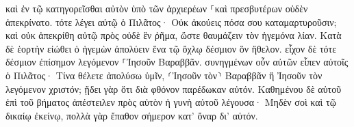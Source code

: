 \documentclass{openreader}
\begin{document}
καὶ ἐν τῷ κατηγορεῖσθαι αὐτὸν ὑπὸ τῶν ἀρχιερέων ⸀καὶ πρεσβυτέρων οὐδὲν ἀπεκρίνατο. 
τότε λέγει αὐτῷ ὁ Πιλᾶτος· Οὐκ ἀκούεις πόσα σου καταμαρτυροῦσιν; 
καὶ οὐκ ἀπεκρίθη αὐτῷ πρὸς οὐδὲ ἓν ῥῆμα, ὥστε θαυμάζειν τὸν ἡγεμόνα λίαν. 
Κατὰ δὲ ἑορτὴν εἰώθει ὁ ἡγεμὼν ἀπολύειν ἕνα τῷ ὄχλῳ δέσμιον ὃν ἤθελον. 
εἶχον δὲ τότε δέσμιον ἐπίσημον λεγόμενον ⸀Ἰησοῦν Βαραββᾶν. 
συνηγμένων οὖν αὐτῶν εἶπεν αὐτοῖς ὁ Πιλᾶτος· Τίνα θέλετε ἀπολύσω ὑμῖν, ⸂Ἰησοῦν τὸν⸃ Βαραββᾶν ἢ Ἰησοῦν τὸν λεγόμενον χριστόν; 
ᾔδει γὰρ ὅτι διὰ φθόνον παρέδωκαν αὐτόν. 
Καθημένου δὲ αὐτοῦ ἐπὶ τοῦ βήματος ἀπέστειλεν πρὸς αὐτὸν ἡ γυνὴ αὐτοῦ λέγουσα· Μηδὲν σοὶ καὶ τῷ δικαίῳ ἐκείνῳ, πολλὰ γὰρ ἔπαθον σήμερον κατ’ ὄναρ δι’ αὐτόν. 
\end{document}
